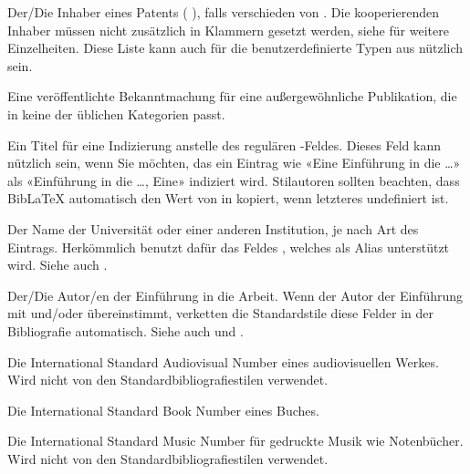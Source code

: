 \documentclass{ltxdockit}[2011/03/25]
\newcommand*{\biblatex}{BibLaTeX\xspace}
\begin{document}
\begin{fieldlist}

Der/Die Inhaber eines Patents ( ), falls verschieden von .
Die kooperierenden Inhaber müssen nicht zusätzlich in Klammern gesetzt werden,
siehe   für weitere Einzelheiten. Diese Liste kann auch für
die benutzerdefinierte Typen aus  nützlich sein.


Eine veröffentlichte Bekanntmachung für eine außergewöhnliche Publikation, die
in keine der üblichen Kategorien passt.


Ein Titel für eine Indizierung anstelle des
regulären -Feldes. Dieses Feld kann nützlich sein, wenn Sie
möchten, das ein Eintrag wie «Eine Einführung in die \dots» als «Einführung in
die \dots, Eine» indiziert wird. Stilautoren sollten beachten, dass \biblatex
automatisch den Wert von  in  kopiert, wenn
letzteres undefiniert ist.


Der Name der Universität oder einer anderen Institution, je nach Art des
Eintrags. Herkömmlich benutzt \bibtex dafür das Feldes ,
welches als Alias unterstützt wird. Siehe auch .


Der/Die Autor/en der Einführung in die Arbeit. Wenn der Autor der Einführung mit
 und\slash oder  übereinstimmt, verketten
die Standardstile diese Felder in der Bibliografie automatisch. Siehe auch
 und .


Die International Standard Audiovisual Number eines audiovisuellen Werkes. Wird
nicht von den Standardbibliografiestilen verwendet.


Die International Standard Book Number eines Buches.


Die International Standard Music Number für gedruckte Musik wie Notenbücher.
Wird nicht von den Standardbibliografiestilen  verwendet.



\end{fieldlist}
\end{document}
